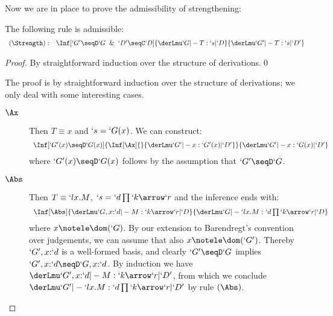 \documentclass{lmcs}
\newcommand{\Comment}[1]{}
\begin{document}
Now we are in place to prove the admissibility of strengthening:

 \begin{lem} \label{lem:strengthening}
The following rule is admissible:
%
 \[ \begin{array}{rl}
(\Strength): &
\Inf	[ `G' \seqD `G \And `D' \seqC `D ]
	{ \derLmu `G |- T : `s | `D 
	}{ \derLmu `G' |- T : `s | `D' }
 \end{array} \] 
 \end{lem}

 \begin{proof}
By straightforward induction over the structure of derivations.\qed
{%
The proof is by straightforward induction over the structure of derivations; we only deal with some interesting cases. 

 \begin{description}
 \item [$ \Ax $] 
Then $T\equiv x$ and $`s = `G(x)$. %
We can construct: %
%
 \[ \begin{array}{c}
\Inf	[ `G'(x) \seqD `G(x)]
	{\Inf	[\Ax]{}
{ \derLmu `G' |- x : `G'(x) | `D' } 
	}{ \derLmu `G' |- x : `G(x) | `D' }
 \end{array} \]
where $`G'(x) \seqD `G(x)$ follows by the assumption that $`G' \seqD `G$.

 \item [$ \Abs $] 
Then $T \equiv `lx.M$, $`s = `d\prod`k\arrow `r$ and the inference ends with:
%
 \[ \begin{array}{c}
\Inf	[\Abs]
	{\InfBox{ \derLmu `G,x{:}`d |- M : `k\arrow `r | `D } 
	}{\derLmu `G |- `lx.M : `d\prod `k\arrow `r | `D }
 \end{array} \]
where $x \notele \dom(`G)$. 
By our extension to Barendregt's convention over judgements, we can assume that also $x \notele \dom(`G')$. 
Thereby $`G', x{:}`d$ is a well-formed basis, and clearly $`G' \seqD `G$ implies $`G', x{:}`d \seqD `G, x{:}`d$. 
By induction we have $ \derLmu `G',x{:}`d |- M : `k\arrow `r | `D' $, from which we conclude $ \derLmu `G' |- `lx.M : `d\prod `k\arrow `r | `D' $ by rule $(\Abs)$.



\end{description}}
\end{proof}
\end{document}
